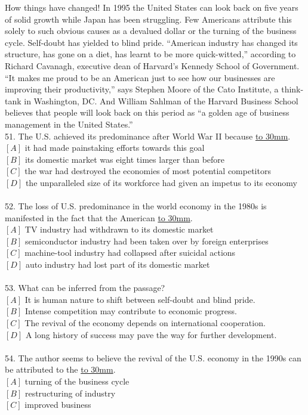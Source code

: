 \documentclass[a4paper]{article}
\begin{document}
\par
How things have changed! In 1995 the United States can look back on five years of solid growth while Japan has been struggling. Few Americans attribute this solely to such obvious causes as a devalued dollar or the turning of the business cycle. Self-doubt has yielded to blind pride. “American industry has changed its structure, has gone on a diet, has learnt to be more quick-witted,” according to Richard Cavanagh, executive dean of Harvard’s Kennedy School of Government. “It makes me proud to be an American just to see how our businesses are improving their productivity,” says Stephen Moore of the Cato Institute, a think-tank in Washington, DC. And William Sahlman of the Harvard Business School believes that people will look back on this period as “a golden age of business management in the United States.”
\\51.	The U.S. achieved its predominance after World War II because \underline{\hbox to 30mm{}}.\\$[A]$ it had made painstaking efforts towards this goal\\$[B]$ its domestic market was eight times larger than before\\$[C]$ the war had destroyed the economies of most potential competitors\\$[D]$ the unparalleled size of its workforce had given an impetus to its economy\\\\52.	The loss of U.S. predominance in the world economy in the 1980s is manifested in the fact that the American \underline{\hbox to 30mm{}}.\\$[A]$ TV industry had withdrawn to its domestic market\\$[B]$ semiconductor industry had been taken over by foreign enterprises\\$[C]$ machine-tool industry had collapsed after suicidal actions\\$[D]$ auto industry had lost part of its domestic market\\\\53.	What can be inferred from the passage?\\$[A]$ It is human nature to shift between self-doubt and blind pride.\\$[B]$ Intense competition may contribute to economic progress.\\$[C]$ The revival of the economy depends on international cooperation.\\$[D]$ A long history of success may pave the way for further development.\\\\54.	The author seems to believe the revival of the U.S. economy in the 1990s can be attributed to the \underline{\hbox to 30mm{}}.\\$[A]$ turning of the business cycle\\$[B]$ restructuring of industry\\$[C]$ improved business 
\end{document}
